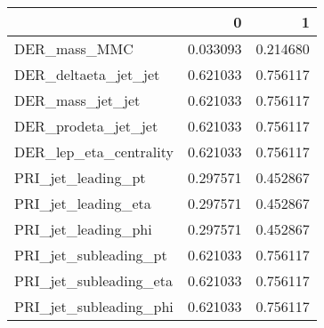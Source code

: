 \begin{tabular}{lrr}
\toprule
{} &         0 &         1 \\
\midrule
DER\_mass\_MMC           &  0.033093 &  0.214680 \\
DER\_deltaeta\_jet\_jet   &  0.621033 &  0.756117 \\
DER\_mass\_jet\_jet       &  0.621033 &  0.756117 \\
DER\_prodeta\_jet\_jet    &  0.621033 &  0.756117 \\
DER\_lep\_eta\_centrality &  0.621033 &  0.756117 \\
PRI\_jet\_leading\_pt     &  0.297571 &  0.452867 \\
PRI\_jet\_leading\_eta    &  0.297571 &  0.452867 \\
PRI\_jet\_leading\_phi    &  0.297571 &  0.452867 \\
PRI\_jet\_subleading\_pt  &  0.621033 &  0.756117 \\
PRI\_jet\_subleading\_eta &  0.621033 &  0.756117 \\
PRI\_jet\_subleading\_phi &  0.621033 &  0.756117 \\
\bottomrule
\end{tabular}
